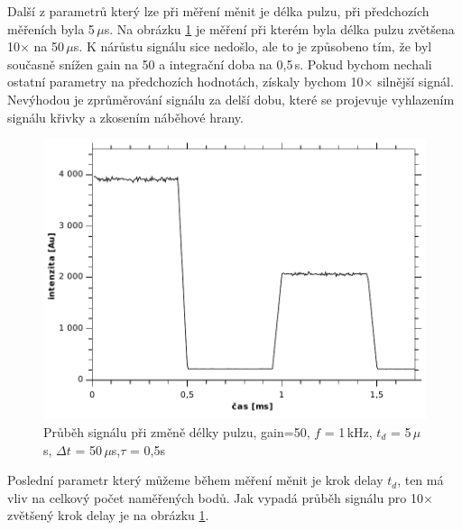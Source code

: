 \documentclass[12pt]{article}
\begin{document}
Další z parametrů který lze při měření měnit je délka pulzu, při předchozích měřeních byla 5\,$\mu$s. Na obrázku \ref{delka} je měření při kterém byla délka pulzu zvětšena 10$\times$ na 50\,$\mu$s. K nárůstu signálu sice nedošlo, ale to je způsobeno tím, že byl současně snížen gain na 50 a integrační doba na 0,5\,s. Pokud bychom nechali ostatní parametry na předchozích hodnotách, získaly bychom 10$\times$ silnější signál. Nevýhodou je zprůměrování signálu za delší dobu, které se projevuje vyhlazením signálu křivky a zkosením náběhové hrany.

\begin{figure}[htbp]
\begin{center}
\includegraphics[width=12cm]{delka.pdf}
\caption{Průběh signálu při změně délky pulzu, gain=50, $f$ = 1\,kHz, $t_d$ = 5\,$\mu$s, $\Delta t$ = 50\,$\mu$s,\newline $\tau$ = 0,5s}
\label{delka}
\end{center}
\end{figure}

Poslední parametr který můžeme během měření měnit je krok delay $t_d$, ten má vliv na celkový počet naměřených bodů. Jak vypadá průběh signálu pro 10$\times$ zvětšený krok delay je na obrázku \ref{delka}.
\end{document}
